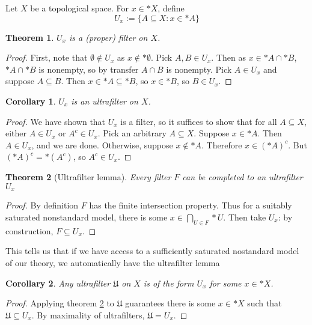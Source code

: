 \documentclass{article}
\newtheorem{theorem}{Theorem}
\newtheorem{corr}{Corollary}
\begin{document}
Let $X$ be a topological space. For $x\in *X$, define
\[
U_x:=\{A\subseteq X: x\in *A\}
\]
\begin{theorem}
  $U_x$ is a (proper) filter on $X$. 
\end{theorem}
\begin{proof}
  First, note that $\emptyset \notin U_x$ as $x\notin *\emptyset$.
  Pick $A,B\in U_x$. Then as $x\in *A\cap *B$, $*A\cap *B$ is nonempty, so by transfer $A\cap B$ is nonempty.
  Pick $A\in U_x$ and suppose $A\subseteq B$. Then $x\in *A\subseteq *B$, so $x\in *B$, so $B\in U_x$. 
\end{proof}
\begin{corr}
  $U_x$ is an ultrafilter on $X$.
\end{corr}
\begin{proof}
  We have shown that $U_x$ is a filter, so it suffices to show that for all $A\subseteq X$, either $A\in U_x$ or $A^c\in U_x$. Pick an arbitrary $A\subseteq X$. Suppose $x\in *A$. Then $A\in U_x$, and we are done. Otherwise, suppose $x\notin *A$. Therefore $x\in (*A)^c$. But $(*A)^c=*(A^c)$, so $A^c\in U_x$.
\end{proof}

\begin{theorem}[Ultrafilter lemma]
  \label{ultrafilter-lemma-nsa}
  Every filter $F$ can be completed to an ultrafilter $U_x$
\end{theorem}
\begin{proof}
  By definition $F$ has the finite intersection property. Thus for a suitably saturated nonstandard model, there is some $x\in \bigcap_{U\in F}*U$. Then take $U_x$: by construction, $F\subseteq U_x$.
\end{proof}
This tells us that if we have access to a sufficiently saturated nostandard model of our theory, we automatically have the ultrafilter lemma
\begin{corr}
  Any ultrafilter $\mathfrak U$ on $X$ is of the form $U_x$ for some $x\in *X$.
\end{corr}
\begin{proof}
  Applying theorem \ref{ultrafilter-lemma-nsa} to $\mathfrak U$ guarantees there is some $x\in *X$ such that $\mathfrak U\subseteq U_x$. By maximality of ultrafilters, $\mathfrak U = U_x$.
\end{proof}
\end{document}
